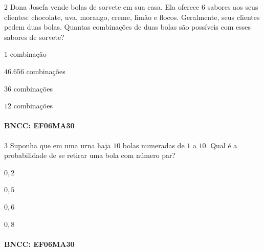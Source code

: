 \num{2}  Dona Josefa vende bolas de sorvete em sua casa. Ela oferece $6$ sabores
aos seus clientes: chocolate, uva, morango, creme, limão e flocos.
Geralmente, seus clientes pedem duas bolas. Quantas combinações de duas
bolas são possíveis com esses sabores de sorvete?

\begin{escolha}
\item $1$ combinação
\item $46.656$ combinações
\item $36$ combinações
\item $12$ combinações
\end{escolha}

\paragraph{BNCC: EF06MA30 }


\num{3}  Suponha que em uma urna haja $10$ bolas numeradas de $1$ a $10$. Qual é a
probabilidade de se retirar uma bola com número par?

\begin{escolha}
\item $0,2$
\item $0,5$
\item $0,6$
\item $0,8$
\end{escolha}

\paragraph{BNCC: EF06MA30 }

